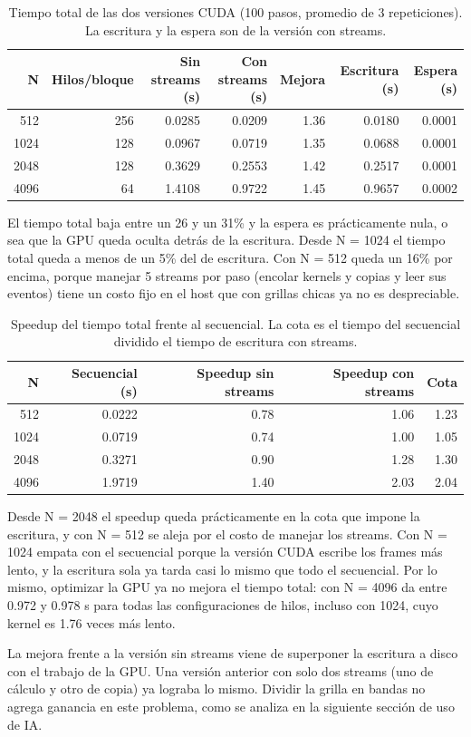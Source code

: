 \begin{table}[H]
  \centering
  \begin{tabular}{rrrrrrr}
    \toprule
    N & Hilos/bloque & Sin streams (s) & Con streams (s) & Mejora & Escritura (s) & Espera (s) \\
    \midrule
    512  & 256 & 0.0285 & 0.0209 & 1.36 & 0.0180 & 0.0001 \\
    1024 & 128 & 0.0967 & 0.0719 & 1.35 & 0.0688 & 0.0001 \\
    2048 & 128 & 0.3629 & 0.2553 & 1.42 & 0.2517 & 0.0001 \\
    4096 & 64  & 1.4108 & 0.9722 & 1.45 & 0.9657 & 0.0002 \\
    \bottomrule
  \end{tabular}
  \caption{Tiempo total de las dos versiones CUDA (100 pasos, promedio de 3 repeticiones). La escritura y la espera son de la versión con streams.}
  \label{tab:streams}
\end{table}

El tiempo total baja entre un 26 y un 31\% y la espera es prácticamente nula, o sea que la GPU queda oculta detrás de la escritura. Desde N = 1024 el tiempo total queda a menos de un 5\% del de escritura. Con N = 512 queda un 16\% por encima, porque manejar 5 streams por paso (encolar kernels y copias y leer sus eventos) tiene un costo fijo en el host que con grillas chicas ya no es despreciable.

\begin{table}[H]
  \centering
  \begin{tabular}{rrrrr}
    \toprule
    N & Secuencial (s) & Speedup sin streams & Speedup con streams & Cota \\
    \midrule
    512  & 0.0222 & 0.78 & 1.06 & 1.23 \\
    1024 & 0.0719 & 0.74 & 1.00 & 1.05 \\
    2048 & 0.3271 & 0.90 & 1.28 & 1.30 \\
    4096 & 1.9719 & 1.40 & 2.03 & 2.04 \\
    \bottomrule
  \end{tabular}
  \caption{Speedup del tiempo total frente al secuencial. La cota es el tiempo del secuencial dividido el tiempo de escritura con streams.}
  \label{tab:speedup_streams}
\end{table}

Desde N = 2048 el speedup queda prácticamente en la cota que impone la escritura, y con N = 512 se aleja por el costo de manejar los streams. Con N = 1024 empata con el secuencial porque la versión CUDA escribe los frames más lento, y la escritura sola ya tarda casi lo mismo que todo el secuencial. Por lo mismo, optimizar la GPU ya no mejora el tiempo total: con N = 4096 da entre 0.972 y 0.978 s para todas las configuraciones de hilos, incluso con 1024, cuyo kernel es 1.76 veces más lento.

La mejora frente a la versión sin streams viene de superponer la escritura a disco con el trabajo de la GPU. Una versión anterior con solo dos streams (uno de cálculo y otro de copia) ya lograba lo mismo. Dividir la grilla en bandas no agrega ganancia en este problema, como se analiza en la siguiente sección de uso de IA.